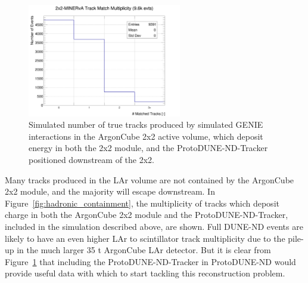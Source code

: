 \begin{figure}[htb]
  \centering
  \includegraphics[width=0.6\textwidth]{plots/2x2_minerva_plots/track_mathch_multiplicity.png}
  \caption{Simulated number of true tracks produced by simulated GENIE interactions in the ArgonCube 2x2 active volume, which deposit energy in both the 2x2 module, and the ProtoDUNE-ND-Tracker positioned downstream of the 2x2.}
  \label{fig:track_multiplicity_min}
\end{figure}
Many tracks produced in the LAr volume are not contained by the ArgonCube 2x2 module, and the majority will escape downstream. In Figure~\ref{fig:hadronic_containment}, the multiplicity of tracks which deposit charge in both the ArgonCube 2x2 module and the ProtoDUNE-ND-Tracker, included in the simulation described above, are shown. Full DUNE-ND events are likely to have an even higher LAr to scintillator track multiplicity due to the pile-up in the much larger 35 t ArgonCube LAr detector. But it is clear from Figure~\ref{fig:track_multiplicity_min} that including the ProtoDUNE-ND-Tracker in ProtoDUNE-ND would provide useful data with which to start tackling this reconstruction problem.

